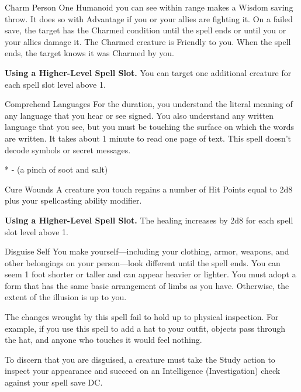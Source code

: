 

\pagestyle{empty}

\begin{Spell}[
    level=1st,
    time=1 Action,
    range=30 ft.,
    components={V, S},
    duration=1 Hour,
    school=Enchantment,
    attack=WIS Save,
    effect=Charmed
]{Charm Person}
One Humanoid you can see within range makes a Wisdom saving throw. It does so with Advantage if you or your allies are fighting it. On a failed save, the target has the Charmed condition until the spell ends or until you or your allies damage it. The Charmed creature is Friendly to you. When the spell ends, the target knows it was Charmed by you.

\textbf{Using a Higher-Level Spell Slot.} You can target one additional creature for each spell slot level above 1.
\end{Spell}


\begin{Spell}[
    level=1st,
    time=1 Action,
    range=Self,
    components={V, S, M*},
    duration=1 Hour,
    school=Divination,
    attack=None,
    effect=Social
  ]{Comprehend Languages}
For the duration, you understand the literal meaning of any language that you hear or see signed. You also understand any written language that you see, but you must be touching the surface on which the words are written. It takes about 1 minute to read one page of text. This spell doesn't decode symbols or secret messages.

* - (a pinch of soot and salt)
\end{Spell}


\begin{Spell}[
    level=1st,
    time=1 Action,
    range=Touch,
    components={V, S},
    duration=Instantaneous,
    school=Abjuration,
    attack=None,
    effect=Healing
  ]{Cure Wounds}
A creature you touch regains a number of Hit Points equal to 2d8 plus your spellcasting ability modifier.

\textbf{Using a Higher-Level Spell Slot.} The healing increases by 2d8 for each spell slot level above 1.
\end{Spell}


\begin{Spell}[
    level=1st,
    time=1 Action,
    range=Self,
    components={V, S},
    duration=1 Hour,
    school=Illusion,
    attack=None,
    effect=Shapechanging
]{Disguise Self}
You make yourself—including your clothing, armor, weapons, and other belongings on your person—look different until the spell ends. You can seem 1 foot shorter or taller and can appear heavier or lighter. You must adopt a form that has the same basic arrangement of limbs as you have. Otherwise, the extent of the illusion is up to you.

The changes wrought by this spell fail to hold up to physical inspection. For example, if you use this spell to add a hat to your outfit, objects pass through the hat, and anyone who touches it would feel nothing.

To discern that you are disguised, a creature must take the Study action to inspect your appearance and succeed on an Intelligence (Investigation) check against your spell save DC.
\end{Spell}


